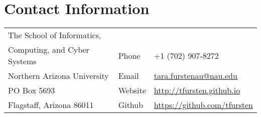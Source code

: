 \documentclass[11pt]{article}
\begin{document}
\section*{Contact Information}
\begin{tabular}[c]{p{3.5in}ll}
The School of Informatics,\\Computing, and Cyber Systems& Phone & +1 (702) 907-8272\\
Northern Arizona University& Email & \href{mailto:tara.furstenau@nau.edu}{tara.furstenau@nau.edu}\\
PO Box 5693 & Website & \href{http://tfursten.github.io}{http://tfursten.github.io}\\
Flagstaff, Arizona 86011& Github &\href{https://github.com/tfursten}{https://github.com/tfursten}\\
\end{tabular}


\end{document}
